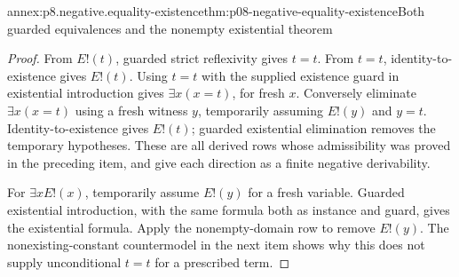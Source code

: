 \begin{annexitem}{annex:p8.negative.equality-existence}{thm:p08-negative-equality-existence}{Both guarded equivalences and the nonempty existential theorem}
\begin{proof}
From \(E!(t)\), guarded strict reflexivity gives \(t=t\).
From \(t=t\), identity-to-existence gives \(E!(t)\).
Using \(t=t\) with the supplied existence guard in existential
introduction gives \(\exists x(x=t)\), for fresh \(x\).
Conversely eliminate \(\exists x(x=t)\) using a fresh witness
\(y\), temporarily assuming \(E!(y)\) and \(y=t\).
Identity-to-existence gives \(E!(t)\); guarded existential
elimination removes the temporary hypotheses.  These are all
derived rows whose admissibility was proved in the preceding item,
and give each direction as a finite negative derivability.

For \(\exists xE!(x)\), temporarily assume \(E!(y)\) for a
fresh variable.  Guarded existential introduction, with the same
formula both as instance and guard, gives the existential formula.
Apply the nonempty-domain row to remove \(E!(y)\).
The nonexisting-constant countermodel in the next item shows why
this does not supply unconditional \(t=t\) for a prescribed term.
\end{proof}
\end{annexitem}

